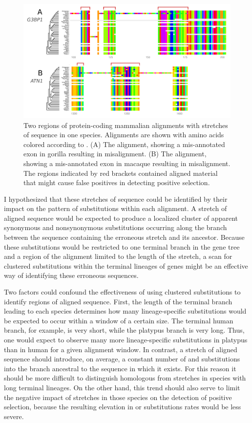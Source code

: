 \begin{figure}
\centering \includegraphics[scale=0.25]{Figs/mammals_cluster_subs.pdf}
\caption{Two regions of protein-coding mammalian alignments with
  stretches of \nhom sequence in one species. Alignments are shown
  with amino acids colored according to \citet{Taylor1986}. (A) The
   alignment, showing a mis-annotated exon in gorilla
  resulting in misalignment. (B) The  alignment, showing a
  mis-annotated exon in macaque resulting in misalignment. The regions
  indicated by red brackets contained aligned \nhom material that
  might cause false positives in detecting \sw positive selection.}
\label{fig_mammals_cluster_subs}
\end{figure}

I hypothesized that these stretches of \nhom sequence could be
identified by their impact on the pattern of substitutions within each
alignment. A stretch of \nhom aligned sequence would be expected to
produce a localized cluster of apparent synonymous and nonsynonymous
substitutions occurring along the branch between the sequence
containing the erroneous stretch and its ancestor. Because these
substitutions would be restricted to one terminal branch in the gene
tree and a region of the alignment limited to the length of the \nhom
stretch, a scan for clustered substitutions within the terminal
lineages of genes might be an effective way of identifying these
erroneous sequences.

Two factors could confound the effectiveness of using clustered
substitutions to identify regions of \nhom aligned sequence. First,
the length of the terminal branch leading to each species determines
how many lineage-specific substitutions would be expected to occur
within a window of a certain size. The terminal human branch, for
example, is very short, while the platypus branch is very long. Thus,
one would expect to observe many more lineage-specific substitutions
in platypus than in human for a given alignment window. In contrast, a
stretch of \nhom aligned sequence should introduce, on average, a
constant number of \nsyn and \syn substitutions into the branch
ancestral to the sequence in which it exists. For this reason it
should be more difficult to distinguish homologous from \nhom
stretches in species with long terminal lineages. On the other hand,
this trend should also serve to limit the negative impact of \nhom
stretches in those species on the detection of positive selection,
because the resulting elevation in \nsyn or \syn substitutions rates
would be less severe.

